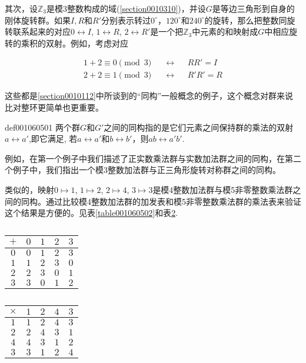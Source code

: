 其次，设$\mathbb{Z}_3$是模3整数构成的域(\ref{section0010310})，并设$G$是等边三角形到自身的刚体旋转群。如果$I, R$和$R'$分别表示转过$0^{\circ}$，$120^{\circ}$和$240^{\circ}$的旋转，那么把整数同旋转联系起来的对应$0 \leftrightarrow I$, $1 \leftrightarrow R$, $2 \leftrightarrow R'$是一个把$\mathbb{Z}_3$中元素的和映射成$G$中相应旋转的乘积的双射。例如，考虑对应

\begin{equation*}
\begin{aligned}
1 + 2 \equiv 0 \pmod{3}\quad &\leftrightarrow &&RR' = I\\
2 + 2 \equiv 1 \pmod{3}\quad &\leftrightarrow &&R'R' = R
\end{aligned}
\end{equation*}

这些都是\ref{section0010112}中所谈到的“同构”一般概念的例子，这个概念对群来说比对整环更简单也更重要。
\begin{definition}{}{def001060501}
两个群$G$和$G'$之间的同构指的是它们元素之间保持群的乘法的双射$a \leftrightarrow a'$,即它满足, 若$a \leftrightarrow a'$和$b \leftrightarrow b'$，则$ab \leftrightarrow a'b'$.
\end{definition}

例如，在第一个例子中我们描述了正实数乘法群与实数加法群之间的同构，在第二个例子中，我们指出一个模3整数加法群与正三角形旋转对称群之间的同构。

类似的，映射$0 \mapsto 1$, $1 \mapsto 2$, $2 \mapsto 4$, $3 \mapsto 3$是模4整数加法群与模5非零整数乘法群之间的同构。通过比较模4整数加法群的加发表和模5非零整数乘法群的乘法表来验证这个结果是方便的。见表\ref{table001060502}和表\ref{table001060503}.
\begin{table}[htbp]
\begin{minipage}{0.45\textwidth}
\centering
\caption{}\label{table001060502}
\begin{tabular}{c|cccc}
$+$ & $0$ & $1$ & $2$ & $3$ \\ \hline
$0$ & $0$ & $1$ & $2$ & $3$ \\
$1$ & $1$ & $2$ & $3$ & $0$ \\
$2$ & $2$ & $3$ & $0$ & $1$ \\
$3$ & $3$ & $0$ & $1$ & $2$ 
\end{tabular}
\end{minipage}
\begin{minipage}{0.45\textwidth}
\centering
\caption{}\label{table001060503}
\begin{tabular}{c|cccc}
$\times$ & $1$ & $2$ & $4$ & $3$ \\ \hline
$1$ & $1$ & $2$ & $4$ & $3$ \\
$2$ & $2$ & $4$ & $3$ & $1$ \\
$4$ & $4$ & $3$ & $1$ & $2$ \\
$3$ & $3$ & $1$ & $2$ & $4$ 
\end{tabular}
\end{minipage}
\end{table}

